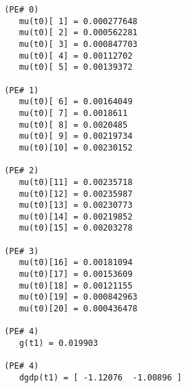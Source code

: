 \begin{verbatim}
 (PE# 0)
    mu(t0)[ 1] = 0.000277648
    mu(t0)[ 2] = 0.000562281
    mu(t0)[ 3] = 0.000847703
    mu(t0)[ 4] = 0.00112702
    mu(t0)[ 5] = 0.00139372

 (PE# 1)
    mu(t0)[ 6] = 0.00164049
    mu(t0)[ 7] = 0.0018611
    mu(t0)[ 8] = 0.0020485
    mu(t0)[ 9] = 0.00219734
    mu(t0)[10] = 0.00230152

 (PE# 2)
    mu(t0)[11] = 0.00235718
    mu(t0)[12] = 0.00235987
    mu(t0)[13] = 0.00230773
    mu(t0)[14] = 0.00219852
    mu(t0)[15] = 0.00203278

 (PE# 3)
    mu(t0)[16] = 0.00181094
    mu(t0)[17] = 0.00153609
    mu(t0)[18] = 0.00121155
    mu(t0)[19] = 0.000842963
    mu(t0)[20] = 0.000436478

 (PE# 4)
    g(t1) = 0.019903

 (PE# 4)
    dgdp(t1) = [ -1.12076  -1.00896 ]
\end{verbatim}